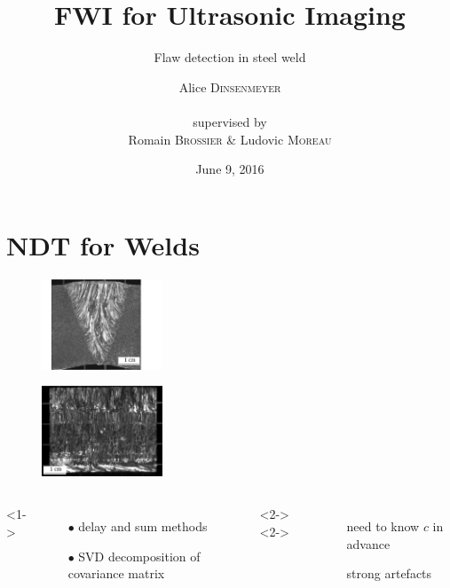 \documentclass[11pt,xcolor=x11names,compress, notes=show]{beamer}%
\author{Alice \textsc{Dinsenmeyer} \\~\\ supervised by \\ Romain \textsc{Brossier} \& Ludovic \textsc{Moreau}}
\title{FWI for Ultrasonic Imaging}
\subtitle{Flaw detection in steel weld}
\date{\small June 9, 2016}
\begin{document}
\begin{frame}
	\titlepage 
\end{frame}


\section*{NDT for Welds}
\begin{frame}{\insertsectionhead}
\vspace{0.3cm}
	\begin{minipage}[c]{0.49\textwidth}
		\centering
		\begin{figure}
			\includegraphics[height=2.7cm,right]{./img/soudure1.png}
		\end{figure}
	\end{minipage}
	\begin{minipage}[c]{0.49\textwidth}
		\centering
		\begin{figure}
			\includegraphics[height=2.7cm,left]{./img/soudure2.png}\\
		\end{figure}
	\end{minipage}
	
	\begin{columns}[c]
			<1->
				\begin{itemize}
					\item[$\bullet$] delay and sum methods
					\item[$\bullet$] SVD decomposition of covariance matrix 
				\end{itemize}
			<2->
			<2->
				\begin{itemize}
					\item[\ding{55}] need to know $c$ in advance
					\item[\ding{55}] strong artefacts
				\end{itemize}
			

\end{columns}
\end{frame}
\end{document}
